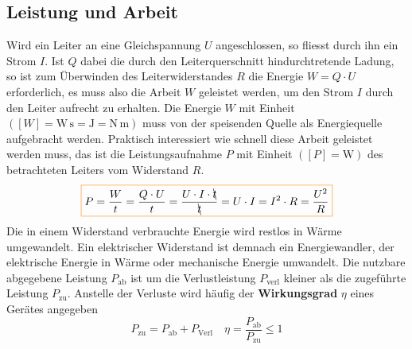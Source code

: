 \subsection{Leistung und Arbeit}
Wird ein Leiter an eine Gleichspannung $U$ angeschlossen, so fliesst durch ihn ein Strom $I$. Ist $Q$ dabei die durch den Leiterquerschnitt hindurchtretende Ladung, so ist zum Überwinden des Leiterwiderstandes $R$ die Energie $W=Q\cdot U$ erforderlich, es muss also die Arbeit $W$ geleistet werden, um den Strom $I$ durch den Leiter aufrecht zu erhalten.
\newline\newline
Die Energie $W$ mit Einheit $\left([W]=\text{W}\,\text{s}=\text{J}=\text{N}\,\text{m}\right)$ muss von der speisenden Quelle als Energiequelle aufgebracht werden. Praktisch interessiert wie schnell diese Arbeit geleistet werden muss, das ist die Leistungsaufnahme $P$ mit Einheit $\left([P]=\text{W}\right)$ des betrachteten Leiters vom Widerstand $R$.
\begin{equation}
\boxed{P=\dfrac{W}{t}=\dfrac{Q\cdot U}{t}=\dfrac{U\cdot I\cdot \bcancel{t}}{\bcancel{t}}=U\cdot I=I^2\cdot R=\dfrac{U^2}{R}}
\end{equation}
Die in einem Widerstand verbrauchte Energie wird restlos in Wärme umgewandelt. Ein elektrischer Widerstand ist demnach ein Energiewandler, der elektrische Energie in Wärme oder mechanische Energie umwandelt.
\newline\newline
Die nutzbare abgegebene Leistung $P_{\text{ab}}$ ist um die Verlustleistung $P_{\text{verl}}$ kleiner als die zugeführte Leistung $P_{\text{zu}}$. Anstelle der Verluste wird häufig der \textbf{Wirkungsgrad} $\eta$ eines Gerätes angegeben
\begin{equation}
\boxed{P_{\text{zu}}=P_{\text{ab}}+P_{\text{Verl}}}\quad \boxed{\eta=\dfrac{P_{\text{ab}}}{P_{\text{zu}}}\leq 1}
\end{equation}
